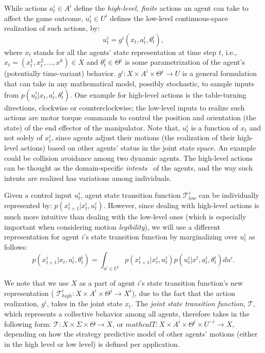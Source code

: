 \documentclass[letterpaper, 10 pt, conference]{ieeeconf}  %
\begin{document}
While actions $a_t^i \in A^i$ define the \textit{high-level, finite} actions an 
agent can take to affect the game outcome, $u_t^i \in U^i$ defines the low-level continuous-space
realization of such actions, by:
\begin{equation}\label{eq:g_function}
  u_t^i = g^i(x_t, a^i_t, \theta^i_t),
\end{equation}
where $x_t$ stands for all the agents' state representation at time step $t$, i.e., $x_t = (x^1_t, x^2_t,...,x^k)\in X$ and $\theta^i_t \in \Theta^i$ is some parametrization of the agent's (potentially time-variant) behavior.
$g^i:X \times A^i \times \Theta^i \rightarrow U$ is a general formulation that 
can take in any mathematical model, possibly stochastic, to sample inputs from $p(u_t^i|x_t,a^i_t,\theta_t^i)$. 
One example for high-level actions is the table-turning directions, clockwise 
or counterclockwise; the 
low-level inputs to realize such actions are motor torque commands to 
control the position and orientation (the state) of the end effector of the 
manipulator. Note that, $u_t^i$ is a 
function of $x_t$ and not solely of $x^i_t$, since agents adjust their 
motions (the realization of their high-level actions) based on other agents' 
status in the joint state space. 
An example could be collision 
avoidance among two dynamic agents.
The high-level actions can be thought as the 
domain-specific \textit{intents}~\cite{dragan2013generating} of the agents, and 
the way such intents are realized has variations among individuals.  

Given a control input $u_t^i$, agent state transition function $\mathcal{T}^i_{low}$ 
can be individually represented by: $p(x^i_{t+1}|x^i_t,u^i_t)$. However, since 
dealing with high-level actions is much more intuitive than dealing with the 
low-level ones (which is especially important when considering motion \textit{legibility}), we will use a different representation for agent $i$'s 
state transition function by marginalizing over $u^i_t$ as follows:
\begin{equation}
  p(x^i_{t+1}|x_t,a^i_t,\theta^i_t) = \int_{u^i \in U^i} 
  p(x_{t+1}^i|x^i_t,u^i_t) p(u^i_t|x^t,a^i_t,\theta^i_t)du^i.
\end{equation}

We note that we use $X$ as a part of agent $i$'s state transition function's 
new representation (
$\mathcal{T}^i_{high}:X \times A^i \times \Theta^i \rightarrow X^i$), due to 
the fact that the action realization, $g^i$, takes in the joint state $x_t$. 
The \textit{joint state transition function}, $\mathcal{T}$, which 
represents a collective behavior among all agents, therefore takes in the 
following form: 
$\mathcal{T}:X \times \Sigma \times \Theta \rightarrow X$, or 
$mathcal{T}:X \times A^i \times \Theta^i \times U^{-i} \rightarrow X$, 
depending on how the strategy predictive model of other agents' motions 
(either in the high level or low level) is defined per application. 
\end{document}
